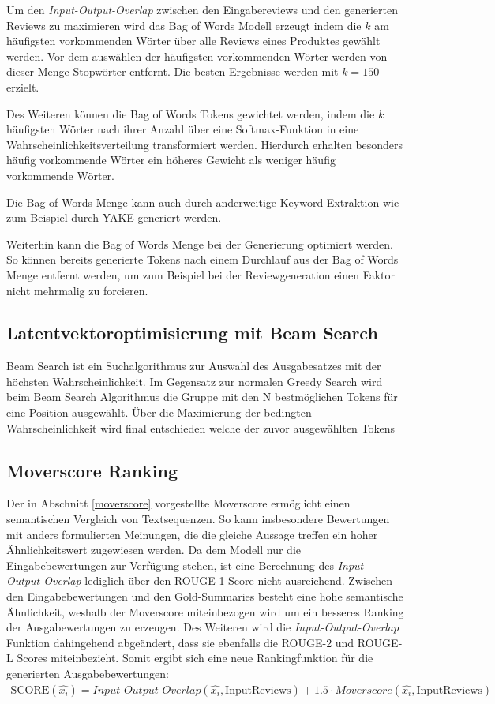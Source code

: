 Um den \textit{Input-Output-Overlap} zwischen den Eingabereviews und den generierten Reviews zu maximieren wird das Bag of Words Modell erzeugt indem die $k$ am häufigsten vorkommenden Wörter über alle Reviews eines Produktes gewählt werden.
Vor dem auswählen der häufigsten vorkommenden Wörter werden von dieser Menge Stopwörter entfernt.
Die besten Ergebnisse werden mit $k=150$ erzielt. %

Des Weiteren können die Bag of Words Tokens gewichtet werden, indem die $k$ häufigsten Wörter nach ihrer Anzahl über eine Softmax-Funktion in eine Wahrscheinlichkeitsverteilung transformiert werden.
Hierdurch erhalten besonders häufig vorkommende Wörter ein höheres Gewicht als weniger häufig vorkommende Wörter.

Die Bag of Words Menge kann auch durch anderweitige Keyword-Extraktion wie zum Beispiel durch YAKE \citep{CAMPOS2020257} generiert werden.


Weiterhin kann die Bag of Words Menge bei der Generierung optimiert werden. 
So können bereits generierte Tokens nach einem Durchlauf aus der Bag of Words Menge entfernt werden, um zum Beispiel bei der Reviewgeneration einen Faktor nicht mehrmalig zu forcieren.


\subsection{Latentvektoroptimisierung mit Beam Search}
Beam Search ist ein Suchalgorithmus zur Auswahl des Ausgabesatzes mit der höchsten Wahrscheinlichkeit. 
Im Gegensatz zur normalen Greedy Search wird beim Beam Search Algorithmus die Gruppe mit den N bestmöglichen Tokens für eine Position ausgewählt. 
Über die Maximierung der bedingten Wahrscheinlichkeit wird final entschieden welche der zuvor ausgewählten Tokens 

\subsection{Moverscore Ranking}
\label{moverscore_ranking}
Der in Abschnitt \ref{moverscore} vorgestellte Moverscore ermöglicht einen semantischen Vergleich von Textsequenzen. 
So kann insbesondere Bewertungen mit anders formulierten Meinungen, die die gleiche Aussage treffen ein hoher Ähnlichkeitswert zugewiesen werden.
Da dem Modell nur die Eingabebewertungen zur Verfügung stehen, ist eine Berechnung des \textit{Input-Output-Overlap} lediglich über den ROUGE-1 Score nicht ausreichend.
Zwischen den Eingabebewertungen und den Gold-Summaries besteht eine hohe semantische Ähnlichkeit, weshalb der Moverscore miteinbezogen wird um ein besseres Ranking der Ausgabewertungen zu erzeugen.
Des Weiteren wird die \textit{Input-Output-Overlap} Funktion dahingehend abgeändert, dass sie ebenfalls die ROUGE-2 und ROUGE-L Scores miteinbezieht.
Somit ergibt sich eine neue Rankingfunktion für die generierten Ausgabebewertungen:
\begin{align*}
    \text{SCORE}(\hat{x_i}) = Input\text{-}Output\text{-}Overlap(\hat{x_i}, \text{InputReviews}) + 1.5 \cdot Moverscore(\hat{x_i}, \text{InputReviews})
\end{align*}

